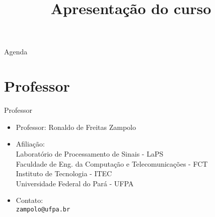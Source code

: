 


\title{\cursogrande\\ \vspace{1cm}Apresentação do curso}


   \maketitle[randomdots={false}]
   \begin{slide}{Agenda}
      \tableofcontents[content=sections]
   \end{slide}

   \section[ slide = true ]{Professor }
      \begin{slide}[toc=]{Professor}
         \begin{itemize}
            \item Professor: Ronaldo de Freitas Zampolo
            \item Afiliação:\\
                  Laboratório de Processamento de Sinais - LaPS\\
                  Faculdade de Eng. da Computação e Telecomunicações - FCT\\
                  Instituto de Tecnologia - ITEC\\
                  Universidade Federal do Pará - UFPA
            \item Contato:\\
                  \texttt{zampolo@ufpa.br}\\ 
         \end{itemize}
      \end{slide}
      
